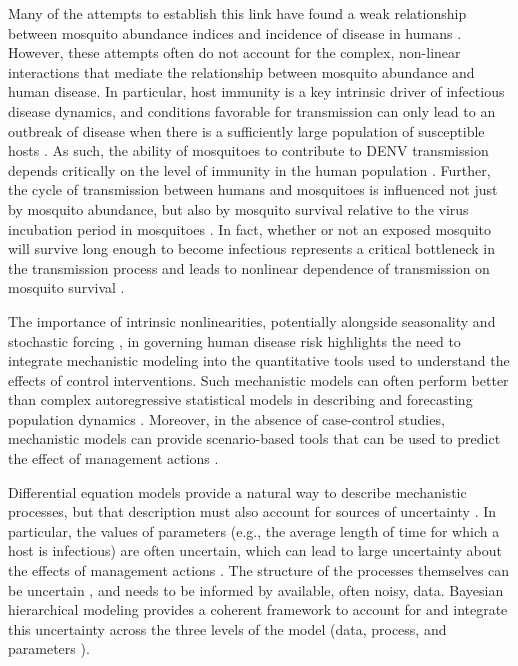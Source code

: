 \documentclass[10pt,letterpaper]{article}
\begin{document}
Many of the attempts to establish this link have found a weak relationship between mosquito abundance indices and incidence of disease in humans \cite{Bowman2014, Pepin2015,Cromwell2017}.
However, these attempts often do not account for the complex, non-linear interactions that mediate the relationship between mosquito abundance and human disease.
In particular, host immunity is a key intrinsic driver of infectious disease dynamics, and conditions favorable for transmission can only lead to an outbreak of disease when there is a sufficiently large population of susceptible hosts \cite{Koelle2004, Koelle2005}.
As such, the ability of mosquitoes to contribute to DENV transmission depends critically on the level of immunity in the human population \cite{Scott2010a}.
Further, the cycle of transmission between humans and mosquitoes is influenced not just by mosquito abundance, but also by mosquito survival relative to the virus incubation period in mosquitoes \cite{Smith2012}.
In fact, whether or not an exposed mosquito will survive long enough to become infectious represents a critical bottleneck in the transmission process and leads to nonlinear dependence of transmission on mosquito survival \cite{Smith2012}.

The importance of intrinsic nonlinearities, potentially alongside seasonality and stochastic forcing \cite{Ellner1998,Koelle2004,Grenfell2002}, in governing human disease risk highlights the need to integrate mechanistic modeling into the quantitative tools used to understand the effects of control interventions.
Such mechanistic models can often perform better than complex autoregressive statistical models in describing and forecasting population dynamics \cite{Reilly2005}.
Moreover, in the absence of case-control studies, mechanistic models can provide scenario-based tools that can be used to predict the effect of management actions \cite{Buckland2007}.

Differential equation models provide a natural way to describe mechanistic processes, but that description must also account for sources of uncertainty \cite{Hotelling1927, Wikle2010}.
In particular, the values of parameters (e.g., the average length of time for which a host is infectious) are often uncertain, which can lead to large uncertainty about the effects of management actions \cite{Elderd2006}.
The structure of the processes themselves can be uncertain \cite{Ellner1998}, and needs to be informed by available, often noisy, data.
Bayesian hierarchical modeling provides a coherent framework to account for and integrate this uncertainty across the three levels of the model (data, process, and parameters \cite{Berliner1996, Cressie2009}).
\end{document}
